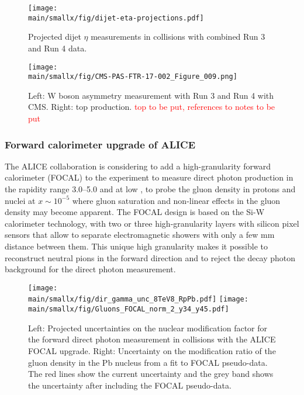 \documentclass[../report.tex]{subfiles}
\providecommand{\main}{..}
\begin{document}
\begin{figure} %
\centering
\texttt{[image: \\main/smallx/fig/dijet-eta-projections.pdf]}
\caption{
Projected dijet $\eta$ measurements in \pPb collisions with combined Run 3 and Run 4 data.
\label{fig:dijet-eta-projection-cms}
}
\end{figure}

\begin{figure}
    \texttt{[image: \\main/smallx/fig/CMS-PAS-FTR-17-002\_Figure\_009.png]}
    \caption{Left: W boson asymmetry measurement with Run 3 and Run 4 with CMS. Right: top production. \textcolor{red}{top to be put, references to notes to be put}
    \label{fig:CMShighpt}
    }
\end{figure}

\clearpage
\newpage

\subsubsection{Forward calorimeter upgrade of ALICE}

The ALICE collaboration is considering to add a high-granularity forward calorimeter (FOCAL) to the experiment to  measure direct photon production in the rapidity range 3.0--5.0 and at low \pT, to probe the gluon density in protons and nuclei at $x\sim 10^{-5}$ where gluon saturation and non-linear effects in the gluon density may become apparent. The FOCAL design is based on the Si-W calorimeter technology, with two or three high-granularity layers with silicon pixel sensors that allow to separate electromagnetic showers with only a few mm distance between them. This unique high granularity makes it possible to reconstruct neutral pions in the forward direction and to reject the decay photon background for the direct photon measurement.

\begin{figure}
\texttt{[image: \\main/smallx/fig/dir\_gamma\_unc\_8TeV8\_RpPb.pdf]}
\texttt{[image: \\main/smallx/fig/Gluons\_FOCAL\_norm\_2\_y34\_y45.pdf]}
\caption{\label{fig:focal}Left: Projected uncertainties on the nuclear modification factor for the forward direct photon measurement in \pPb collisions with the ALICE FOCAL upgrade. Right: Uncertainty on the modification ratio of the gluon density in the Pb nucleus from a fit to FOCAL pseudo-data. The red lines show the current uncertainty and the grey band shows the uncertainty after including the FOCAL pseudo-data.}
\end{figure}
\end{document}
